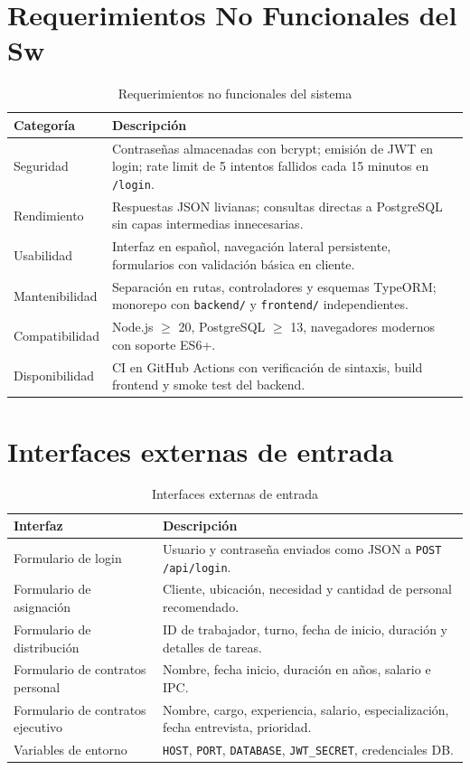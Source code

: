 \documentclass[12pt,a4paper]{report}
\begin{document}
\pagebreak
\section{Requerimientos No Funcionales del Sw}

\begin{table}[htbp]
  \centering
  \caption{Requerimientos no funcionales del sistema}
  \label{tab:rnf}
  \begin{tabular}{@{}p{2.5cm}p{10cm}@{}}
    \toprule
    \textbf{Categoría} & \textbf{Descripción} \\
    \midrule
    Seguridad & Contraseñas almacenadas con bcrypt; emisión de JWT en login; rate limit de 5 intentos fallidos cada 15 minutos en \texttt{/login}. \\
    Rendimiento & Respuestas JSON livianas; consultas directas a PostgreSQL sin capas intermedias innecesarias. \\
    Usabilidad & Interfaz en español, navegación lateral persistente, formularios con validación básica en cliente. \\
    Mantenibilidad & Separación en rutas, controladores y esquemas TypeORM; monorepo con \texttt{backend/} y \texttt{frontend/} independientes. \\
    Compatibilidad & Node.js $\geq$ 20, PostgreSQL $\geq$ 13, navegadores modernos con soporte ES6+. \\
    Disponibilidad & CI en GitHub Actions con verificación de sintaxis, build frontend y smoke test del backend. \\
    \bottomrule
  \end{tabular}
\end{table}

\pagebreak
\section{Interfaces externas de entrada}

\begin{table}[htbp]
  \centering
  \caption{Interfaces externas de entrada}
  \label{tab:entrada}
  \begin{tabular}{@{}p{3.5cm}p{9cm}@{}}
    \toprule
    \textbf{Interfaz} & \textbf{Descripción} \\
    \midrule
    Formulario de login & Usuario y contraseña enviados como JSON a \texttt{POST /api/login}. \\
    Formulario de asignación & Cliente, ubicación, necesidad y cantidad de personal recomendado. \\
    Formulario de distribución & ID de trabajador, turno, fecha de inicio, duración y detalles de tareas. \\
    Formulario de contratos personal & Nombre, fecha inicio, duración en años, salario e IPC. \\
    Formulario de contratos ejecutivo & Nombre, cargo, experiencia, salario, especialización, fecha entrevista, prioridad. \\
    Variables de entorno & \texttt{HOST}, \texttt{PORT}, \texttt{DATABASE}, \texttt{JWT\_SECRET}, credenciales DB. \\
    \bottomrule
  \end{tabular}
\end{table}
\end{document}
